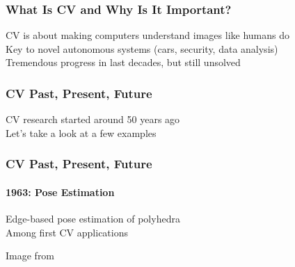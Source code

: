 \documentclass[xetex,professionalfont]{beamer}
\begin{document}

\begin{frame}
\frametitle{What Is CV and Why Is It Important?}

CV is about making computers understand images like humans do\\\medskip
Key to novel autonomous systems (cars, security, data analysis)\\\medskip
Tremendous progress in last decades, but still unsolved

\end{frame}


{
\begin{frame}


\end{frame}
}


\begin{frame}
\frametitle{CV Past, Present, Future}

CV research started around 50 years ago\\\medskip
Let's take a look at a few examples

\end{frame}


\begin{frame}
\frametitle{CV Past, Present, Future}
\framesubtitle{1963: Pose Estimation}

Edge-based pose estimation of polyhedra \\\medskip %
Among first CV applications %

\bigskip
\begin{center}
    {\centering Image from \cite{roberts1963}}
\end{center}

\end{frame}
\end{document}

